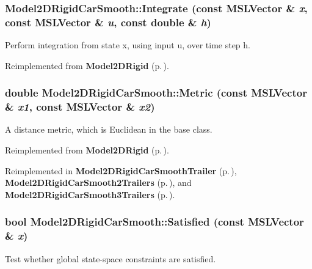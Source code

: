 \subsubsection{ Model2DRigid\-Car\-Smooth::Integrate (const {\bf MSLVector} \& {\em x}, const {\bf MSLVector} \& {\em u}, const double \& {\em h})\hspace{0.3cm}{\tt  [virtual]}}\label{classModel2DRigidCarSmooth_a3}


Perform integration from state x, using input u, over time step h.



Reimplemented from {\bf Model2DRigid} {\rm (p.\,\pageref{classModel2DRigid_a2})}.
\subsubsection{\setlength{\rightskip}{0pt plus 5cm}double Model2DRigid\-Car\-Smooth::Metric (const {\bf MSLVector} \& {\em x1}, const {\bf MSLVector} \& {\em x2})\hspace{0.3cm}{\tt  [virtual]}}\label{classModel2DRigidCarSmooth_a4}


A distance metric, which is Euclidean in the base class.



Reimplemented from {\bf Model2DRigid} {\rm (p.\,\pageref{classModel2DRigid_a5})}.

Reimplemented in {\bf Model2DRigid\-Car\-Smooth\-Trailer} {\rm (p.\,\pageref{classModel2DRigidCarSmoothTrailer_a3})}, {\bf Model2DRigid\-Car\-Smooth2Trailers} {\rm (p.\,\pageref{classModel2DRigidCarSmooth2Trailers_a3})}, and {\bf Model2DRigid\-Car\-Smooth3Trailers} {\rm (p.\,\pageref{classModel2DRigidCarSmooth3Trailers_a3})}.
\subsubsection{\setlength{\rightskip}{0pt plus 5cm}bool Model2DRigid\-Car\-Smooth::Satisfied (const {\bf MSLVector} \& {\em x})\hspace{0.3cm}{\tt  [virtual]}}\label{classModel2DRigidCarSmooth_a6}


Test whether global state-space constraints are satisfied.



